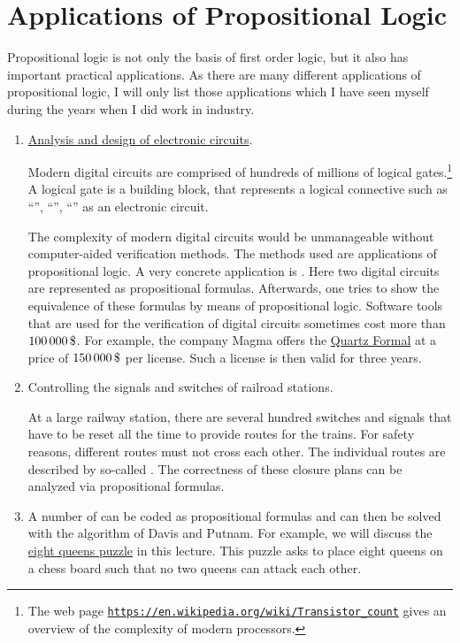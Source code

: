\section{Applications of Propositional Logic}
Propositional logic is not only the basis of first order logic, but it also has important practical
applications.  As there are many different applications of propositional logic, I will only list those
applications which I have seen myself during the years when I did work in industry.
\begin{enumerate}
\item \href{https://en.wikipedia.org/wiki/Electronic_design_automation}{Analysis and design of electronic circuits}.

      Modern digital circuits are comprised of hundreds of millions of logical gates.\footnote{The web page
      \href{https://en.wikipedia.org/wiki/Transistor_count}{\texttt{https://en.wikipedia.org/wiki/Transistor\_count}}
      gives an overview of the complexity of modern processors.}
      A logical gate  is a building block, that represents a logical connective such as ``'',
      ``'', ``'' as an electronic circuit.

      The complexity of modern digital circuits would be unmanageable without
      computer-aided verification methods.  The methods used are applications of propositional logic. 
      A very concrete application is .  Here two
      digital circuits are represented as propositional formulas.
      Afterwards, one tries to show the equivalence of these formulas by means of propositional logic.
      Software tools that are used for the verification of digital
      circuits sometimes cost more than $100\,000\,\symbol{36}$.
      For example, the company Magma offers the 
      \href{https://www.eetimes.com/document.asp?doc_id=1217672}{Quartz Formal} at a price
      of $150\,000\,
      \symbol{36}$ per license.  Such a license is then valid for three years.


\item Controlling the signals and switches of railroad stations.

      At a large railway station, there are several hundred switches and signals that have to be 
      reset all the time to provide routes for the trains.
      For safety reasons, different routes must not cross each other.  
      The individual routes are described by so-called .
      The correctness of these closure plans can be analyzed via propositional formulas.
\item A number of  can be coded as propositional formulas and can then be solved with the
      algorithm of Davis and Putnam.
      For example, we will discuss the 
      \href{https://en.wikipedia.org/wiki/Eight_queens_puzzle}{eight queens puzzle} in this lecture.
      This puzzle asks to place eight queens on a chess board such that no two queens can attack each other.
\end{enumerate}

